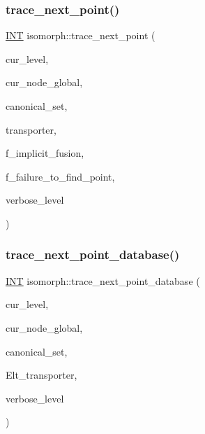 \subsubsection{\texorpdfstring{trace\+\_\+next\+\_\+point()}{trace\_next\_point()}}
{\footnotesize\ttfamily \mbox{\hyperlink{galois_8h_a09fddde158a3a20bd2dcadb609de11dc}{I\+NT}} isomorph\+::trace\+\_\+next\+\_\+point (\begin{DoxyParamCaption}\item[{\mbox{\hyperlink{galois_8h_a09fddde158a3a20bd2dcadb609de11dc}{I\+NT}}}]{cur\+\_\+level,  }\item[{\mbox{\hyperlink{galois_8h_a09fddde158a3a20bd2dcadb609de11dc}{I\+NT}}}]{cur\+\_\+node\+\_\+global,  }\item[{\mbox{\hyperlink{galois_8h_a09fddde158a3a20bd2dcadb609de11dc}{I\+NT}} $\ast$}]{canonical\+\_\+set,  }\item[{\mbox{\hyperlink{galois_8h_a09fddde158a3a20bd2dcadb609de11dc}{I\+NT}} $\ast$}]{transporter,  }\item[{\mbox{\hyperlink{galois_8h_a09fddde158a3a20bd2dcadb609de11dc}{I\+NT}}}]{f\+\_\+implicit\+\_\+fusion,  }\item[{\mbox{\hyperlink{galois_8h_a09fddde158a3a20bd2dcadb609de11dc}{I\+NT}} \&}]{f\+\_\+failure\+\_\+to\+\_\+find\+\_\+point,  }\item[{\mbox{\hyperlink{galois_8h_a09fddde158a3a20bd2dcadb609de11dc}{I\+NT}}}]{verbose\+\_\+level }\end{DoxyParamCaption})}

\mbox{\label{classisomorph_a45b142052e2877d9dcaa9f805a95f18f}} 
\subsubsection{\texorpdfstring{trace\+\_\+next\+\_\+point\+\_\+database()}{trace\_next\_point\_database()}}
{\footnotesize\ttfamily \mbox{\hyperlink{galois_8h_a09fddde158a3a20bd2dcadb609de11dc}{I\+NT}} isomorph\+::trace\+\_\+next\+\_\+point\+\_\+database (\begin{DoxyParamCaption}\item[{\mbox{\hyperlink{galois_8h_a09fddde158a3a20bd2dcadb609de11dc}{I\+NT}}}]{cur\+\_\+level,  }\item[{\mbox{\hyperlink{galois_8h_a09fddde158a3a20bd2dcadb609de11dc}{I\+NT}}}]{cur\+\_\+node\+\_\+global,  }\item[{\mbox{\hyperlink{galois_8h_a09fddde158a3a20bd2dcadb609de11dc}{I\+NT}} $\ast$}]{canonical\+\_\+set,  }\item[{\mbox{\hyperlink{galois_8h_a09fddde158a3a20bd2dcadb609de11dc}{I\+NT}} $\ast$}]{Elt\+\_\+transporter,  }\item[{\mbox{\hyperlink{galois_8h_a09fddde158a3a20bd2dcadb609de11dc}{I\+NT}}}]{verbose\+\_\+level }\end{DoxyParamCaption})}

